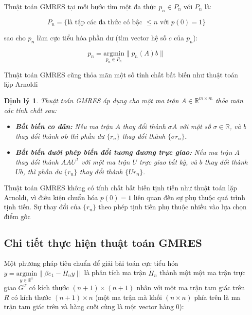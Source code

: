 \documentclass[14pt, a4paper]{article}
\numberwithin{equation}{section}
\numberwithin{algorithm}{section}
\numberwithin{figure}{section}
\newtheorem{dl}{Định lý}
\numberwithin{dl}{section}
\numberwithin{md}{section}
\numberwithin{bd}{section}
\numberwithin{dn}{section}
\begin{document}
Thuật toán GMRES tại mỗi bước tìm một đa thức $p_n \in P_n$ với $P_n$ là:

\begin{equation}
    P_n = \lbrace \text{là tập các đa thức có bậc } \leq n \text{ với } p(0)=1 \rbrace
\end{equation}

sao cho $p_n$ làm cực tiểu hóa phần dư (tìm vector hệ số $c$ của $p_n$):

\begin{equation} \label{eq:Find-Polynomial}
    p_n = \underset{p_n \in P_n}{\mathrm{argmin}} \lVert p_n(A)b \rVert
\end{equation}

Thuật toán GMRES cũng thỏa mãn một số tính chất bất biến như thuật toán lặp Arnoldi

\begin{dl}
    Thuật toán GMRES áp dụng cho một ma trận $A \in \mathbb{R}^{m \times m}$ thỏa mãn các tính chất sau:

    \begin{itemize}
        \item \textbf{Bất biến co dãn:} Nếu ma trận $A$ thay đổi thành $\sigma A$ với một số $\sigma \in \mathbb{R}$, và $b$ thay đổi thành $\sigma b$ thì phần dư $\lbrace r_n \rbrace$ thay đổi thành $\lbrace \sigma r_n \rbrace$.
        \item \textbf{Bất biến dưới phép biến đổi tương đương trực giao:} Nếu ma trận $A$ thay đổi thành $A A U^T$ với một ma trận $U$ trực giao bất kỳ, và $b$ thay đổi thành $Ub$, thì phần dư $\lbrace r_n \rbrace$ thay đổi thành $\lbrace U r_n \rbrace$.
    \end{itemize}
\end{dl}

Thuật toán GMRES không có tính chất bất biến tịnh tiến như thuật toán lặp Arnoldi, vì điều kiện chuẩn hóa $p(0)=1$ liên quan đến sự phụ thuộc quá trình tịnh tiến. Sự thay đổi của $\lbrace r_n \rbrace$ theo phép tịnh tiến phụ thuộc nhiều vào lựa chọn điểm gốc

\subsection{Chi tiết thực hiện thuật toán GMRES}

Một phương pháp tiêu chuẩn để giải bài toán cực tiểu hóa $y = \underset{y \in \mathbb{R}^{n}}{\mathrm{argmin}} \lVert \beta e_1 - \widetilde{H}_n y \rVert$ là phân tích ma trận $\widetilde{H}_n$ thành một một ma trận trực giao $G^T$ có kích thước $(n+1) \times (n+1)$ nhân với một ma trận tam giác trên $R$ có kích thước $(n+1) \times n$ (một ma trận mà khối $(n \times n)$ phía trên là ma trận tam giác trên và hàng cuối cùng là một vector hàng 0):
\end{document}

